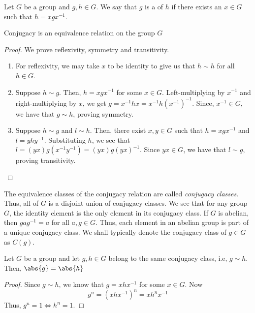 \begin{defn}
    Let $G$ be a group and $g,h \in G$. We say that $g$ is a  of $h$ if there exists an $x \in G$ such that $h = xgx^{-1}$.
\end{defn}

\begin{prop} \label{prop:conjugacy-equivalence}
    Conjugacy is an equivalence relation on the group $G$
\end{prop}
\begin{proof} We prove reflexivity, symmetry and transitivity.
    \begin{enumerate}
        \item For reflexivity, we may take $x$ to be identity to give us that $h \sim h$ for all $h \in G$.
        \item Suppose $h \sim g$. Then, $h = xgx^{-1}$ for some $x \in G$. Left-multiplying by $x^{-1}$ and right-multiplying by $x$, we get $g = x^{-1}hx = x^{-1}h(x^{-1})^{-1}$. Since, $x^{-1} \in G$, we have that $g \sim h$, proving symmetry.
        \item Suppose $h \sim g$ and $l \sim h$. Then, there exist $x,y \in G$ such that $h = xgx^{-1}$ and $l = yhy^{-1}$. Substituting $h$, we see that $l = (yx) g (x^{-1} y^{-1}) = (yx) g (yx)^{-1}$. Since $yx \in G$, we have that $l \sim g$, proving transitivity.
    \end{enumerate}
\end{proof}

The equivalence classes of the conjugacy relation are called \emph{conjugacy classes}. Thus, all of $G$ is a disjoint union of conjugacy classes. We see that for any group $G$, the identity element is the only element in its conjugacy class. If $G$ is abelian, then $gag^{-1} = a$ for all $a, g \in G$. Thus, each element in an abelian group is part of a unique conjugacy class. We shall typically denote the conjugacy class of $g \in G$ as $C(g)$. 

\begin{prop} \label{prop:same-conjugacy-same-order}
    Let $G$ be a group and let $g,h \in G$ belong to the same conjugacy class, i.e, $g \sim h$. Then, $\abs{g} = \abs{h}$
\end{prop}
\begin{proof}
    Since $g \sim h$, we know that $g = xhx^{-1}$ for some $x \in G$. Now
    \[
        g^n = (xhx^{-1})^n = xh^nx^{-1}
    \]
    Thus, $g^n = 1 \iff h^n = 1$.
\end{proof}

